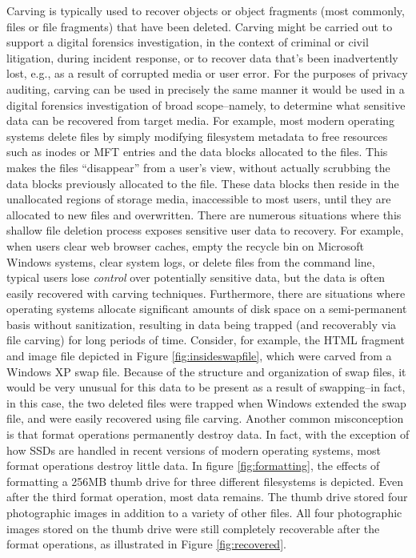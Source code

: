Carving is typically used to recover objects or object fragments (most commonly, files or file fragments) that have been deleted.  Carving might be carried out to support a digital forensics investigation, in the context of criminal or civil litigation, during incident response, or to recover data that's been inadvertently lost, e.g., as a result of  corrupted media or user error.  For the purposes of privacy auditing, carving can be used in precisely the same manner it would be used in a digital forensics investigation of broad scope--namely, to determine what sensitive data can be recovered from target media.  For example, most modern operating systems delete files by simply modifying filesystem metadata to free resources such as inodes or MFT entries and the data blocks allocated to the files.  This makes the files ``disappear'' from a user's view, without actually scrubbing the data blocks previously allocated to the file.  These data blocks then reside in the unallocated regions of storage media, inaccessible to most users, until they are allocated to new files and overwritten.  There are numerous situations where this shallow file deletion process exposes sensitive user data to recovery.  For example, when users clear web browser caches, empty the recycle bin on Microsoft Windows systems, clear system logs, or delete files from the command line, typical users lose \emph{control} over potentially sensitive data, but the data is often easily recovered with carving techniques.  Furthermore, there are situations where operating systems allocate significant amounts of disk space on a semi-permanent basis without sanitization, resulting in data being trapped (and recoverably via file carving) for long periods of time.  Consider, for example, the HTML fragment and image file depicted in Figure \ref{fig:insideswapfile}, which were carved from a Windows XP swap file.  Because of the structure and organization of swap files, it would be very unusual for this data to be present as a result of swapping--in fact, in this case, the two deleted files were trapped when Windows extended the swap file, and were easily recovered using file carving.  Another common misconception is that format operations permanently destroy data.  In fact, with the exception of how SSDs are handled in recent versions of modern operating systems, most format operations destroy little data.  In figure \ref{fig:formatting}, the effects of formatting a 256MB thumb drive for three different filesystems is depicted.  Even after the third format operation, most data remains.  The thumb drive stored four photographic images in addition to a variety of other files.  All four photographic images stored on the thumb drive were still completely recoverable after the format operations, as illustrated in Figure \ref{fig:recovered}.  


